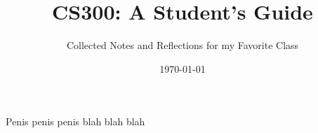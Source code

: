 \documentclass[a4paper, 12pt]{article}
\institute{Brown University}
\title{CS300: A Student's Guide}
\subtitle{Collected Notes and Reflections for my Favorite Class}
\date{\today}
\begin{document}
	Penis penis penis blah blah blah
\end{document}
